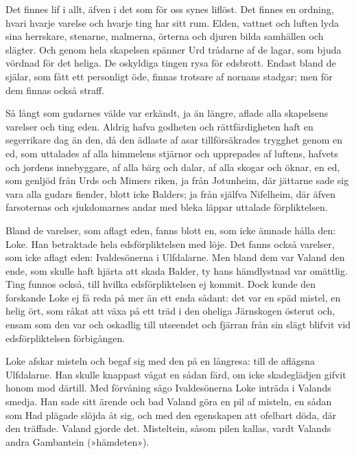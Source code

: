 Det finnes lif i allt, äfven i det som för oss synes liflöst. Det finnes
en ordning, hvari hvarje varelse och hvarje ting har sitt rum. Elden,
vattnet och luften lyda sina herrskare, stenarne, malmerna, örterna och
djuren bilda samhällen och slägter. Och genom hela skapelsen spänner Urd
trådarne af de lagar, som bjuda vördnad för det heliga. De oskyldiga
tingen rysa för edsbrott. Endast bland de själar, som fått ett
personligt öde, finnas trotsare af nornans stadgar; men för dem finnas
också straff.

Så långt som gudarnes välde var erkändt, ja än längre, aflade alla
skapelsens varelser och ting eden. Aldrig hafva godheten och
rättfärdigheten haft en segerrikare dag än den, då den ädlaste af asar
tillförsäkrades trygghet genom en ed, som uttalades af alla himmelens
stjärnor och upprepades af luftens, hafvets och jordens innebyggare, af
alla bärg och dalar, af alla skogar och öknar, en ed, som genljöd från
Urds och Mimers
\protect\hypertarget{lb1625905.xhtmlux5cux23start87}{}{}\protect\hypertarget{lb1625905.xhtmlux5cux23start87-a}{}{}\protect\hypertarget{lb1625905.xhtmlux5cux23start87-b}{}{}\protect\hypertarget{lb1625905.xhtmlux5cux23start87-c}{}{}\protect\hypertarget{lb1625905.xhtmlux5cux23start87-d}{}{}
riken, ja från Jotunheim, där jättarne sade sig vara alla gudars
fiender, blott icke Balders; ja från själfva Nifelheim, där äfven
farsoternas och sjukdomarnes andar med bleka läppar uttalade
förpliktelsen.

Bland de varelser, som aflagt eden, fanns blott en, som icke ämnade
hålla den: Loke. Han betraktade hela edsförpliktelsen med löje. Det
fanns också varelser, som icke aflagt eden: Ivaldesönerna i Ulfdalarne.
Men bland dem var Valand den ende, som skulle haft hjärta att skada
Balder, ty hans hämdlystnad var omättlig. Ting funnos också, till hvilka
edsförpliktelsen ej kommit. Dock kunde den forskande Loke ej få reda på
mer än ett enda sådant: det var en späd mistel, en helig ört, som råkat
att växa på ett träd i den oheliga Järnskogen österut och, ensam som den
var och oskadlig till utseendet och fjärran från sin slägt blifvit vid
edsförpliktelsen förbigången.

Loke afskar misteln och begaf sig med den på en långresa: till de
aflägsna Ulfdalarne. Han skulle knappast vågat en sådan färd, om icke
skadeglädjen gifvit honom mod därtill. Med förvåning sågo Ivaldesönerna
Loke inträda i Valands smedja. Han sade sitt ärende och bad Valand göra
en pil af misteln, en sådan som Had plägade slöjda åt sig, och med den
egenskapen att ofelbart döda, där den träffade. Valand gjorde det.
Misteltein, såsom pilen kallas, vardt Valands andra Gambantein
(»hämdeten»).


